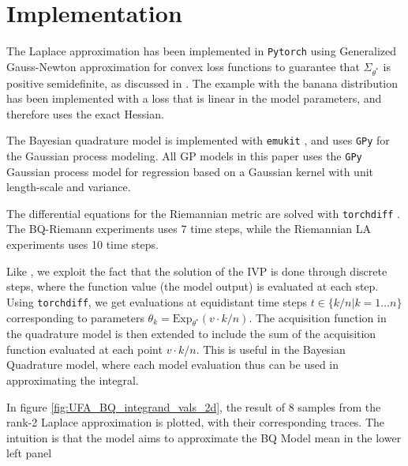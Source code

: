 \section{Implementation}
The Laplace approximation has been implemented in \verb|Pytorch| \cite{pytorch2} using Generalized Gauss-Newton approximation for convex loss functions to guarantee that $\Sigma_{\theta^\ast}$ is positive semidefinite, as discussed in \cite{dauphin2024neglectedhessiancomponentexplains, ksnxr_ggn}.  The example with the banana distribution has been implemented with a loss that is linear in the model parameters, and therefore uses the exact Hessian.

The Bayesian quadrature model is implemented with \verb|emukit| \cite{emukit2019, emukit2023}, and uses \verb|GPy| \cite{gpy2014} for the Gaussian process modeling. All GP models in this paper uses the \verb|GPy| Gaussian process model for regression based on a Gaussian kernel with unit length-scale and variance.

The differential equations for the Riemannian metric are solved with \verb|torchdiff| \cite{Chen_torchdiffeq_2021}. The BQ-Riemann experiments uses 7 time steps, while the Riemannian LA experiments uses 10 time steps.

Like \cite{fröhlich2021bayesianquadratureriemanniandata}, we exploit the fact that the solution of the IVP is done through discrete steps, where the function value (the model output) is evaluated at each step. Using \verb|torchdiff|, we get evaluations at equidistant time steps $t\in \{k/n\vert k=1\ldots n\}$ corresponding to parameters $\theta_k = \text{Exp}_{\theta^\ast}(v\cdot k/n)$. The acquisition function in the quadrature model is then extended to include the sum of the acquisition function evaluated at each point $v\cdot k/n$. This is useful in the Bayesian Quadrature model, where each model evaluation thus can be used in approximating the integral. 

In figure \ref{fig:UFA_BQ_integrand_vals_2d}, the result of 8 samples from the rank-2 Laplace approximation is plotted, with their corresponding traces. The intuition is that the model aims to approximate the BQ Model mean in the lower left panel

